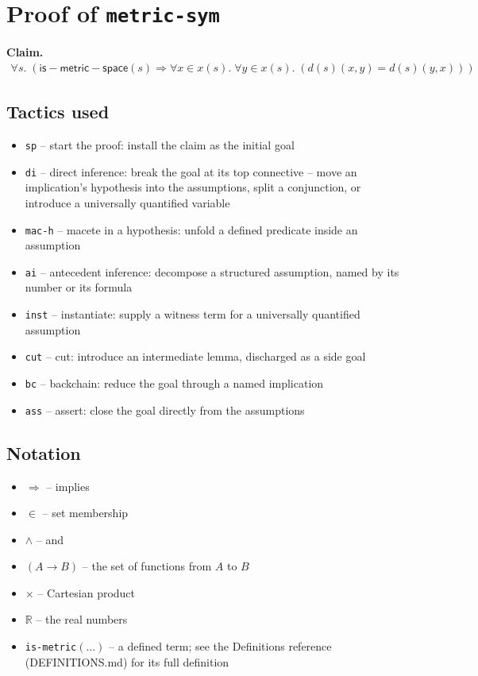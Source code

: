 \documentclass[11pt]{article}
\begin{document}
\section*{Proof of \texttt{metric-sym}}
\textbf{Claim.}
\begin{align*}
  \forall s.\; (\mathsf{is{-}metric{-}space}(s) \Rightarrow \forall x \in x(s).\; \forall y \in x(s).\; (d(s)(x, y) = d(s)(y, x)))
\end{align*}
\bigskip

\subsection*{Tactics used}
\begin{itemize}
\item \texttt{sp} -- start the proof: install the claim as the initial goal
\item \texttt{di} -- direct inference: break the goal at its top connective -- move an implication's hypothesis into the assumptions, split a conjunction, or introduce a universally quantified variable
\item \texttt{mac-h} -- macete in a hypothesis: unfold a defined predicate inside an assumption
\item \texttt{ai} -- antecedent inference: decompose a structured assumption, named by its number or its formula
\item \texttt{inst} -- instantiate: supply a witness term for a universally quantified assumption
\item \texttt{cut} -- cut: introduce an intermediate lemma, discharged as a side goal
\item \texttt{bc} -- backchain: reduce the goal through a named implication
\item \texttt{ass} -- assert: close the goal directly from the assumptions
\end{itemize}

\subsection*{Notation}
\begin{itemize}
\item $\Rightarrow$ -- implies
\item $\in$ -- set membership
\item $\wedge$ -- and
\item $(A \to B)$ -- the set of functions from $A$ to $B$
\item $\times$ -- Cartesian product
\item $\mathbb{R}$ -- the real numbers
\item \texttt{is-metric}$(\ldots)$ -- a defined term; see the Definitions reference (DEFINITIONS.md) for its full definition
\end{itemize}
\end{document}
